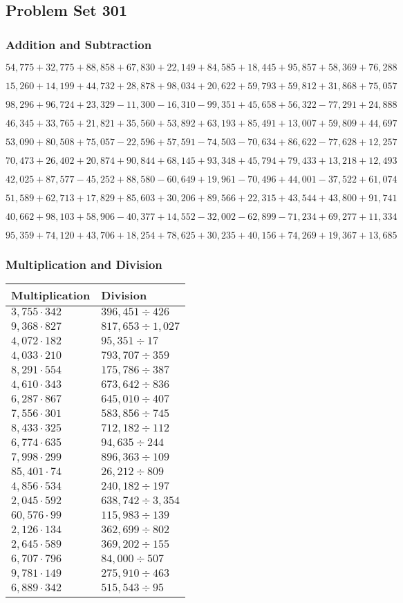 \hypertarget{problem-set-301}{%
\subsection{Problem Set 301}\label{problem-set-301}}

\hypertarget{addition-and-subtraction}{%
\subsubsection{Addition and
Subtraction}\label{addition-and-subtraction}}

\(54,775+32,775+88,858+67,830+22,149+84,585+18,445+95,857+58,369+76,288\)

\(15,260+14,199+44,732+28,878+98,034+20,622+59,793+59,812+31,868+75,057\)

\(98,296+96,724+23,329-11,300-16,310-99,351+45,658+56,322-77,291+24,888\)

\(46,345+33,765+21,821+35,560+53,892+63,193+85,491+13,007+59,809+44,697\)

\(53,090+80,508+75,057-22,596+57,591-74,503-70,634+86,622-77,628+12,257\)

\(70,473+26,402+20,874+90,844+68,145+93,348+45,794+79,433+13,218+12,493\)

\(42,025+87,577-45,252+88,580-60,649+19,961-70,496+44,001-37,522+61,074\)

\(51,589+62,713+17,829+85,603+30,206+89,566+22,315+43,544+43,800+91,741\)

\(40,662+98,103+58,906-40,377+14,552-32,002-62,899-71,234+69,277+11,334\)

\(95,359+74,120+43,706+18,254+78,625+30,235+40,156+74,269+19,367+13,685\)

\hypertarget{multiplication-and-division}{%
\subsubsection{Multiplication and
Division}\label{multiplication-and-division}}

\begin{longtable}[]{@{}ll@{}}
\toprule
Multiplication & Division\tabularnewline
\midrule
\endhead
\(3,755\cdot342\) & \(396,451÷426\)\tabularnewline
\(9,368\cdot827\) & \(817,653÷1,027\)\tabularnewline
\(4,072\cdot182\) & \(95,351÷17\)\tabularnewline
\(4,033\cdot210\) & \(793,707÷359\)\tabularnewline
\(8,291\cdot554\) & \(175,786÷387\)\tabularnewline
\(4,610\cdot343\) & \(673,642÷836\)\tabularnewline
\(6,287\cdot867\) & \(645,010÷407\)\tabularnewline
\(7,556\cdot301\) & \(583,856÷745\)\tabularnewline
\(8,433\cdot325\) & \(712,182÷112\)\tabularnewline
\(6,774\cdot635\) & \(94,635÷244\)\tabularnewline
\(7,998\cdot299\) & \(896,363÷109\)\tabularnewline
\(85,401\cdot74\) & \(26,212÷809\)\tabularnewline
\(4,856\cdot534\) & \(240,182÷197\)\tabularnewline
\(2,045\cdot592\) & \(638,742÷3,354\)\tabularnewline
\(60,576\cdot99\) & \(115,983÷139\)\tabularnewline
\(2,126\cdot134\) & \(362,699÷802\)\tabularnewline
\(2,645\cdot589\) & \(369,202÷155\)\tabularnewline
\(6,707\cdot796\) & \(84,000÷507\)\tabularnewline
\(9,781\cdot149\) & \(275,910÷463\)\tabularnewline
\(6,889\cdot342\) & \(515,543÷95\)\tabularnewline
\bottomrule
\end{longtable}
